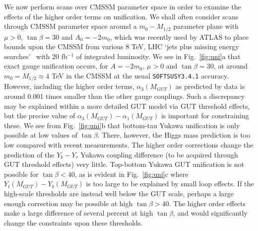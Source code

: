 \documentclass[final,3p,times,pdflatex]{elsarticle}
\begin{document}
We now perform scans over CMSSM parameter space in order to examine the
effects of the higher order terms on unification. 
We shall often consider scans through CMSSM parameter space
around a 
$m_0-M_{1/2}$ parameter plane with $\mu>0$, $\tan \beta=30$ and $A_0=-2m_0$,
which was 
recently used by ATLAS to place bounds upon the CMSSM from various 8
TeV,  LHC `jets plus missing energy
searches'~\cite{Aad:2014wea} with 20 fb$^{-1}$ of
integrated luminosity.  
We see in Fig.~\ref{fig:uni}a that exact gauge unification occurs, for
$A=-2m_0$, $\mu>0$ and $\tan \beta=30$, at around $m_0=M_{1/2}\approx 4$ TeV
in the CMSSM at the usual {\tt SOFTSUSY3.4.1} accuracy. However, including the
higher order terms, $\alpha_3(M_{GUT})$ 
as predicted by data is around 0.001 times smaller than the other gauge
couplings. Such a discrepancy may be explained within a more detailed GUT model
via GUT threshold effects, but the precise value of
$\alpha_3(M_{GUT})-\alpha_1(M_{GUT})$ is important for constraining these. 
We see from Fig.~\ref{fig:uni}b that bottom-tau Yukawa unification is only
possible at low values of $\tan \beta$. There, however, the Higgs mass
prediction is too low compared with recent measurements. The higher order
corrections change the prediction of the $Y_b-Y_\tau$ Yukawa coupling
difference (to be  
acquired through GUT threshold effects) very little. 
Top-bottom Yukawa GUT unification is not possible for $\tan \beta < 40$,
as is evident in Fig.~\ref{fig:uni}c 
where $Y_t(M_{GUT})-Y_b(M_{GUT})$ is too large to be
explained by small loop effects. If the high-scale thresholds are instead well
below the GUT 
scale, perhaps a large enough correction may be possible at high $\tan \beta
> 40$. The higher order
effects make a large difference of several percent at high $\tan \beta$, and 
would significantly change the constraints upon these thresholds. 
\end{document}
